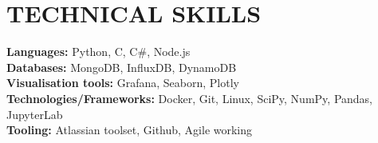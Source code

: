 \documentclass[letterpaper,11pt]{article}
\begin{document}
\section{TECHNICAL SKILLS}
 \begin{itemize}[leftmargin=0.15in, label={}]
    \small{\item{
     \textbf{\normalsize{Languages:}}{ \normalsize{Python, C, C\#, Node.js}} \\
     \textbf{\normalsize{Databases:}}{\normalsize{ MongoDB, InfluxDB, DynamoDB}} \\
     \textbf{\normalsize{Visualisation tools:}}{\normalsize{ Grafana, Seaborn, Plotly }} \\
     \textbf{\normalsize{Technologies/Frameworks:}}{\normalsize{ Docker, Git, Linux, SciPy, NumPy, Pandas, JupyterLab }} \\
     \textbf{\normalsize{Tooling:}}{\normalsize{ Atlassian toolset, Github, Agile working}} \\
    }}
 \end{itemize}
 \vspace{-15pt}

\end{document}
